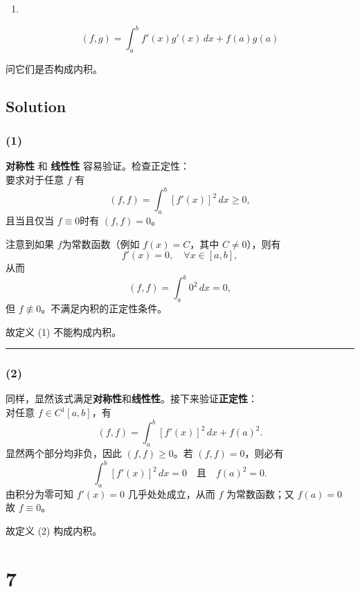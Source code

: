 \documentclass[11pt]{article}
\providecommand{\tightlist}{%
      \setlength{\itemsep}{0pt}\setlength{\parskip}{0pt}}
\begin{document}
\begin{enumerate}
\def\labelenumi{(\arabic{enumi})}
\setcounter{enumi}{1}
\tightlist
\item
\end{enumerate}

\[
(f,g) = \int_a^bf'(x)g'(x)\,dx + f(a)g(a)
\]

问它们是否构成内积。

    \subsection{Solution}\label{solution}

\subsubsection{(1)}\label{section}

\textbf{对称性} 和 \textbf{线性性} 容易验证。检查正定性：\\
要求对于任意 \(f\) 有 \[
(f,f)=\int_a^b \left[f'(x)\right]^2\,dx\ge0,
\] 且当且仅当 \(f\equiv0\)时有 \((f,f)=0\)。

注意到如果 \(f\)为常数函数（例如 \(f(x)=C\)，其中 \(C\neq0\)），则有\\
\[
f'(x)=0,\quad \forall x\in[a,b],
\] 从而 \[
(f,f)=\int_a^b 0^2\,dx=0,
\] 但 \(f\not\equiv0\)。不满足内积的正定性条件。

故定义 (1) 不能构成内积。

\begin{center}\rule{0.5\linewidth}{0.5pt}\end{center}

\subsubsection{(2)}\label{section-1}

同样，显然该式满足\textbf{对称性}和\textbf{线性性}。接下来验证\textbf{正定性}：\\
对任意 \(f\in C^1[a,b]\)，有 \[
(f,f)=\int_a^b \left[f'(x)\right]^2\,dx + f(a)^2.
\] 显然两个部分均非负，因此 \((f,f)\ge0\)。若 \((f,f)=0\)，则必有 \[
\int_a^b \left[f'(x)\right]^2\,dx = 0 \quad \text{且} \quad f(a)^2 = 0.
\] 由积分为零可知 \(f'(x)=0\) 几乎处处成立，从而 \(f\) 为常数函数；又
\(f(a)=0\) 故 \(f\equiv0\)。

故定义 (2) 构成内积。

    \section{7}\label{section}
\end{document}
